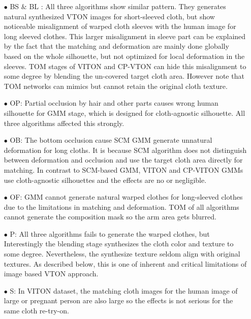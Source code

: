\begin{itemize}

\item[$\bullet$] BS $\&$ BL : All three algorithms show similar pattern. They generates natural synthesized VTON images for short-sleeved cloth, but show noticeable misalignment of warped cloth sleeves with the human image for long sleeved clothes. This larger misalignment in sleeve part can be explained by the fact that the matching and deformation are mainly done globally based on the whole silhouette, but not optimized for local deformation in the sleeves. 
TOM stages of VITON and CP-VTON can hide this misalignment to some degree by blending the un-covered target cloth area. However note that TOM networks can mimics but cannot retain the original cloth texture. 

\item[$\bullet$] OP: Partial occlusion by hair and other parts causes wrong human silhouette for GMM stage, which is designed for cloth-agnostic silhouette. All three algorithms affected this strongly. 

\item[$\bullet$] OB: The bottom occlusion cause SCM GMM generate unnatural deformation for long cloths. It is because SCM algorithm does not distinguish between deformation and occlusion and use the target cloth area directly for matching. In contrast to SCM-based GMM, VITON and CP-VITON GMMs use cloth-agnostic silhouettes and the effects are no or negligible.  

\item[$\bullet$] OF: GMM cannot generate natural warped clothes for long-sleeved clothes due to the limitations in matching and deformation.  TOM of all algorithms cannot generate the composition mask so the arm area gets blurred.  

\item[$\bullet$] P: All three algorithms fails to generate the warped clothes, but Interestingly the blending stage synthesizes the cloth color and texture to some degree. Nevertheless, the synthesize texture seldom align with original textures. As described  below, this is one of inherent and critical limitations of image based VTON approach.  


\item[$\bullet$] S: In VITON dataset, the matching cloth images for the human image of large or pregnant person are also large so the effects is not serious for the same cloth re-try-on.
\end{itemize}

